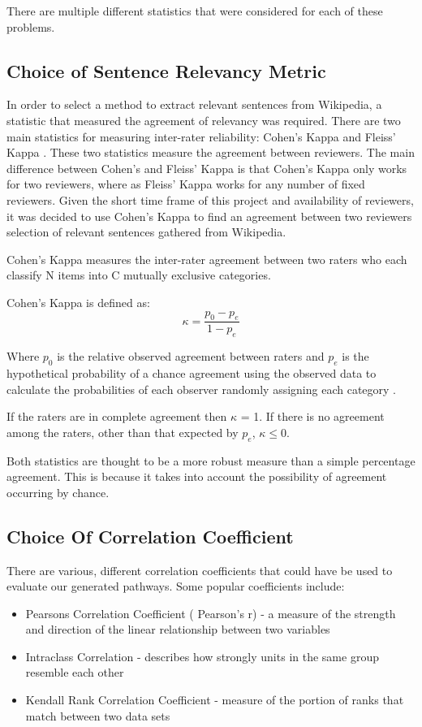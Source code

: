 \documentclass[bsc,frontabs,twoside,singlespacing,parskip,deptreport]{infthesis}     %
\begin{document}
There are multiple different statistics that were considered for each of these problems.
\subsection{Choice of Sentence Relevancy Metric}\label{sec:cohen}
In order to select a method to extract relevant sentences from Wikipedia, a statistic that measured the agreement
of relevancy was required. There are two main statistics for measuring inter-rater reliability: Cohen's Kappa and Fleiss' Kappa \cite{}.
These two statistics measure the agreement between reviewers. The main difference between Cohen's and Fleiss' Kappa is that
Cohen's Kappa only works for two reviewers, where as Fleiss' Kappa works for any number of fixed reviewers.
Given the short time frame of this project and availability of reviewers, it was decided to use Cohen's Kappa
to find an agreement between two reviewers selection of relevant sentences gathered from Wikipedia.

Cohen's Kappa measures the inter-rater agreement between two raters
who each classify N items into C mutually exclusive categories.

Cohen's Kappa is defined as:\\
\begin{equation}
  \kappa = \frac{p_{0} - p_{e}}{1 - p_{e}}\nonumber
\end{equation}

Where $p_0$ is the relative observed agreement between raters and $p_e$ is the hypothetical probability
of a chance agreement using the observed data to calculate the probabilities of each observer randomly assigning each category \cite{}.

If the raters are in complete agreement then $\kappa$ = 1.
If there is no agreement among the raters, other than that expected by $p_e$, $\kappa \leq 0$.

Both statistics are thought to be a more robust measure than a simple percentage agreement.
This is because it takes into account the possibility of agreement occurring by chance.

\subsection{Choice Of Correlation Coefficient}\label{sec:kendall}

There are various, different correlation coefficients that could have be used to evaluate our generated pathways.
Some popular coefficients include:
\begin{itemize}
\item Pearsons Correlation Coefficient ( Pearson's r) - a measure of the strength and direction of the linear relationship between two variables
\item Intraclass Correlation - describes how strongly units in the same group resemble each other
\item Kendall Rank Correlation Coefficient -  measure of the portion of ranks that match between two data sets
\end{itemize}
\end{document}
